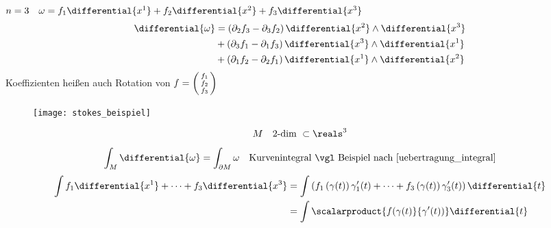 \begin{beispiel*}
  \( n=3\quad \omega=f_1\differential{x^1}+f_2\differential{x^2}+f_3\differential{x^3} \)
  \begin{align*}
      \differential{\omega}&= \left( \partial_2f_3-\partial_3f_2 \right)\differential{x^2}\wedge \differential{x^3}\\
      &+\left( \partial_3f_1-\partial_1f_3 \right) \differential{x^3}\wedge \differential{x^1}\\
      &+\left( \partial_1f_2-\partial_2f_1 \right)\differential{x^1}\wedge \differential{x^2}
  \end{align*}
  Koeffizienten heißen auch Rotation von \( f=\begin{psmallmatrix} f_1\\f_2\\f_3 \end{psmallmatrix} \)
  \begin{figure}[H]
    \centering
    \texttt{[image: stokes\_beispiel]}
    \label{fig:stokes_beispiel}
  \end{figure}
  \begin{equation*}
      M\quad \text{2-dim }\subset \reals^3
  \end{equation*}
  \begin{equation*}
      \int_M\differential{\omega}=\int_{\partial M}\omega\quad \text{Kurvenintegral \vgl Beispiel nach \ref{uebertragung_integral}}
  \end{equation*}
  \begin{align*}
      \int f_1\differential{x^1}+\dotsb +f_3\differential{x^3} &= \int\left( f_1\left( \gamma(t) \right)\gamma_1'(t)+\dotsb +f_3\left( \gamma(t) \right)\gamma_3'(t) \right)\differential{t}\\
      &= \int\scalarproduct{f(\gamma(t)}{\gamma'(t))}\differential{t}
  \end{align*}
\end{beispiel*}

